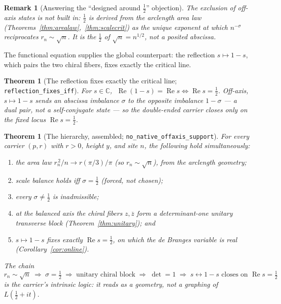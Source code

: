\documentclass[11pt]{article}
\newtheorem{theorem}[definition]{Theorem}
\newtheorem{remark}[definition]{Remark}
\DeclareMathOperator{\Ree}{Re}
\newcommand{\C}{\mathbb{C}}
\newcommand{\conj}[1]{\overline{#1}}
\newcommand{\code}[1]{\texttt{#1}}
\begin{document}
\begin{remark}[Answering the ``designed around $\tfrac12$'' objection]\label{rem:notchosen}
The exclusion of off-axis states is not built in: $\tfrac12$ is \emph{derived} from the arclength area
law (Theorems~\ref{thm:arealaw},~\ref{thm:scalecrit}) as the unique exponent at which $n^{-\sigma}$
reciprocates $r_n\sim\sqrt n$. It is the $\tfrac12$ of $\sqrt n=n^{1/2}$, not a posited abscissa.
\end{remark}

The functional equation supplies the global counterpart: the reflection $s\mapsto1-s$, which pairs the
two chiral fibers, fixes exactly the critical line.

\begin{theorem}[The reflection fixes exactly the critical line; \code{reflection\_fixes\_iff}]\label{thm:reflfix}
For $s\in\C$, $\;\Ree(1-s)=\Ree s\iff\Ree s=\tfrac12$. Off-axis, $s\mapsto1-s$ sends an abscissa
imbalance $\sigma$ to the opposite imbalance $1-\sigma$ --- a dual \emph{pair}, not a self-conjugate
state --- so the double-ended carrier closes only on the fixed locus $\Ree s=\tfrac12$.
\end{theorem}

\begin{theorem}[The hierarchy, assembled; \code{no\_native\_offaxis\_support}]\label{thm:hierarchy}
For every carrier $(p,r)$ with $r>0$, height $y$, and site $n$, the following hold simultaneously:
\begin{enumerate}[label=\textup{(\arabic*)}]
\item the area law $r_n^{\,2}/n\to r(\pi/3)/\pi$ (so $r_n\sim\sqrt n$), from the arclength geometry;
\item scale balance holds iff $\sigma=\tfrac12$ (forced, not chosen);
\item every $\sigma\neq\tfrac12$ is inadmissible;
\item at the balanced axis the chiral fibers $z,\conj z$ form a determinant-one \emph{unitary}
transverse block (Theorem~\ref{thm:unitary}); and
\item $s\mapsto1-s$ fixes exactly $\Ree s=\tfrac12$, on which the de Branges variable is real
(Corollary~\ref{cor:online}).
\end{enumerate}
The chain
\[
  r_n\sim\sqrt n \;\Longrightarrow\; \sigma=\tfrac12 \;\Longrightarrow\;
  \text{unitary chiral block} \;\Longrightarrow\; \det=1 \;\Longrightarrow\;
  s\leftrightarrow1-s \text{ closes on } \Ree s=\tfrac12
\]
is the carrier's intrinsic logic: it reads as a geometry, not a graphing of $L(\tfrac12+it)$.
\end{theorem}
\end{document}
